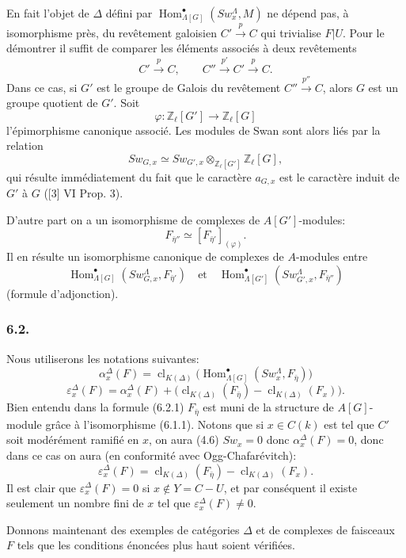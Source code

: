 \documentclass[11pt]{article}
\DeclareMathOperator{\Hom}{Hom}
\providecommand{\Hom}{\operatorname{Hom}}
\providecommand{\clK}[1]{\operatorname{cl}_{K(#1)}}
\providecommand{\Hom}{\operatorname{Hom}}
\begin{document}
En fait l'objet de $\Delta$ défini par $\Hom^\bullet_{\Lambda[G]}(Sw_x^\Lambda,M)$ ne dépend pas, à isomorphisme près, du revêtement galoisien $C'\xrightarrow{p}C$ qui trivialise $F|U$. Pour le démontrer il suffit de comparer les éléments associés à deux revêtements
\[
C'\xrightarrow{p}C,\qquad C''\xrightarrow{p'}C'\xrightarrow{p}C.
\]
Dans ce cas, si $G'$ est le groupe de Galois du revêtement $C''\xrightarrow{p''}C$, alors $G$ est un groupe quotient de $G'$. Soit
\[
\varphi:\mathbb Z_\ell[G']\longrightarrow \mathbb Z_\ell[G]
\]
l'épimorphisme canonique associé. Les modules de Swan sont alors liés par la relation
\[
Sw_{G,x}\simeq Sw_{G',x}\otimes_{\mathbb Z_\ell[G']}\mathbb Z_\ell[G],
\]
qui résulte immédiatement du
fait que le caractère $a_{G,x}$ est le caractère induit de $G'$ à $G$ ([3] VI Prop. 3).

D'autre part on a un isomorphisme de complexes de $A[G']$-modules:
\[
F_{\bar\eta''}\simeq [F_{\bar\eta'}]_{(\varphi)}.
\]
Il en résulte un isomorphisme canonique de complexes de $A$-modules entre
\[
\Hom^\bullet_{\Lambda[G]}(Sw_{G,x}^\Lambda,F_{\bar\eta'})
\quad\text{et}\quad
\Hom^\bullet_{\Lambda[G']}(Sw_{G',x}^\Lambda,F_{\bar\eta''})
\]
(formule d'adjonction).

\subsubsection*{6.2.}

Nous utiliserons les notations suivantes:
\[
\alpha_x^\Delta(F)
=
\clK{\Delta}\bigl(\Hom^\bullet_{\Lambda[G]}(Sw_x^\Lambda,F_{\bar\eta})\bigr)
\tag{6.2.1}
\]
\[
\varepsilon_x^\Delta(F)
=
\alpha_x^\Delta(F)+
\bigl(\clK{\Delta}(F_{\bar\eta})-\clK{\Delta}(F_x)\bigr).
\tag{6.2.2}
\]
Bien entendu dans la formule (6.2.1) $F_{\bar\eta}$ est muni de la structure de $A[G]$-module grâce à l'isomorphisme (6.1.1). Notons que si $x\in C(k)$ est tel que $C'$ soit modérément ramifié en $x$, on aura (4.6) $Sw_x=0$ donc $\alpha_x^\Delta(F)=0$, donc dans ce cas on aura (en conformité avec Ogg-Chafarévitch):
\[
\varepsilon_x^\Delta(F)=\clK{\Delta}(F_{\bar\eta})-\clK{\Delta}(F_x).
\tag{6.2.3}
\]
Il est clair que $\varepsilon_x^\Delta(F)=0$ si $x\notin Y=C-U$, et par conséquent il existe seulement un nombre fini de $x$ tel que $\varepsilon_x^\Delta(F)\ne0$.

Donnons maintenant des exemples de catégories $\Delta$ et de complexes de faisceaux $F$ tels que les conditions énoncées plus haut soient vérifiées.
\end{document}
